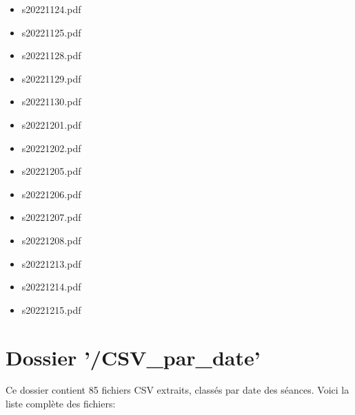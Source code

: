 \documentclass[a4paper,12pt,twoside]{book}
\begin{document}
\begin{itemize}
  \item s20221124.pdf
  \item s20221125.pdf
  \item s20221128.pdf
  \item s20221129.pdf
  \item s20221130.pdf
  \item s20221201.pdf
  \item s20221202.pdf
  \item s20221205.pdf
  \item s20221206.pdf
  \item s20221207.pdf
  \item s20221208.pdf
  \item s20221213.pdf
  \item s20221214.pdf
  \item s20221215.pdf
\end{itemize}

\section*{Dossier '/CSV\_par\_date'}
Ce dossier contient 85 fichiers CSV extraits, classés par date des séances. Voici la liste complète des fichiers:
\end{document}
